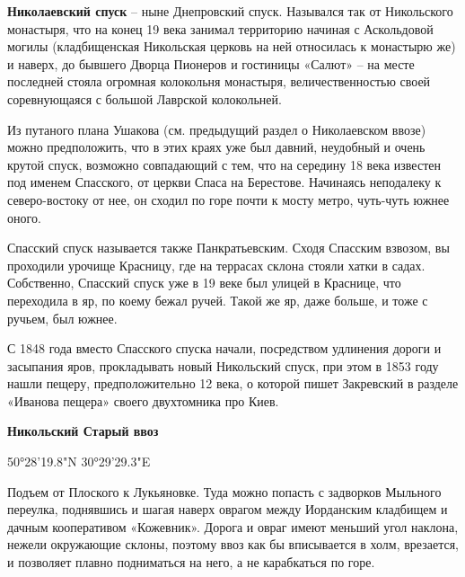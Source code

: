 \medskip





\textbf{Николаевский спуск} – ныне Днепровский спуск. Назывался так от Никольского монастыря, что на конец 19 века занимал территорию начиная с Аскольдовой могилы (кладбищенская Никольская церковь на ней относилась к монастырю же) и наверх, до бывшего Дворца Пионеров и гостиницы «Салют» – на месте последней стояла огромная колокольня монастыря, величественностью своей соревнующаяся с большой Лаврской колокольней.

Из путаного плана Ушакова (см. предыдущий раздел о Николаевском ввозе) можно предположить, что в этих краях уже был давний, неудобный и очень крутой спуск, возможно совпадающий с тем, что на середину 18 века известен под именем Спасского, от церкви Спаса на Берестове. Начинаясь неподалеку к северо-востоку от нее, он сходил по горе почти к мосту метро, чуть-чуть южнее оного. 

Спасский спуск называется также Панкратьевским. Сходя Спасским взвозом, вы проходили урочище Красницу, где на террасах склона стояли хатки в садах. Собственно, Спасский спуск уже в 19 веке был улицей в Краснице, что переходила в яр, по коему бежал ручей. Такой же яр, даже больше, и тоже с ручьем, был южнее.

С 1848 года вместо Спасского спуска начали, посредством удлинения дороги и засыпания яров, прокладывать новый Никольский спуск, при этом в 1853 году нашли пещеру, предположительно 12 века, о которой пишет Закревский в разделе «Иванова пещера» своего двухтомника про Киев.\\


\medskip


\textbf{Никольский Старый ввоз} 

50°28'19.8"N 30°29'29.3"E

Подъем от Плоского к Лукьяновке. Туда можно попасть с задворков Мыльного переулка, поднявшись и шагая наверх оврагом между Иорданским кладбищем и дачным кооперативом «Кожевник». Дорога и овраг имеют меньший угол наклона, нежели окружающие склоны, поэтому ввоз как бы вписывается в холм, врезается, и позволяет плавно подниматься на него, а не карабкаться по горе.

